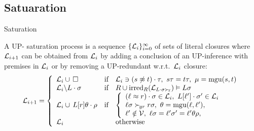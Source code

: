 \documentclass[%
]{beamer}
\begin{document}
\subsection{Satuaration}
\begin{frame}[allowframebreaks]{Saturation}
    \begin{definition}
        A UP-{ saturation process} is
        a sequence \( \{ \mathcal{L}_i \}_{i=0}^\infty \)
        of sets of literal closures where
        \( \mathcal{L}_{i+1} \) can be obtained from
        \( \mathcal{L}_i \)
        by { adding} a conclusion of an UP-inference with premises in $\mathcal{L}_i$
        or by { removing} a UP-redundant w.r.t.~\(\mathcal{L}_i\) closure:
        \begin{gather*}
            \mathcal{L}_{i+1} = \left\{
                \begin{array}{lclc}
                    \mathcal{L}_i \cup\,\square
                    &\text{if}
                    &
                        \mathcal{L}_i\ni(s\not\approx t)\cdot\tau,\ {}
                        s\tau = t\tau,\ {}
                        \mu=\operatorname{mgu}(s,t)
                    \\
                    \mathcal{L}_i \backslash L\cdot\sigma
                    &\text{if}
                    &R \cup \operatorname{irred}_R(\mathcal{L}_{L\cdot\sigma\mathrel\succ_{\!\ell}}) \vDash L\sigma
                    \\
                    \mathcal{L}_i \cup\, L[r]\theta\cdot\rho
                    &\text{if}
                    &\left\{\begin{array}{l}
                        (\ell\approx r)\cdot\sigma\in\mathcal{L}_i,\ {}
                        L[\ell']\cdot\sigma'\in\mathcal{L}_i
                        \\
                        \ell\sigma\mathrel\succ_{\!gr} r\sigma,\ {}
                        \theta=\operatorname{mgu}(\ell,\ell'),
                        \\
                        \ell'\notin\mathcal{V},\ {}
                        \ell\sigma = \ell'\sigma' = \ell'\theta\rho,
                    \end{array}\right.
                    \\
                    \mathcal{L}_i
                    &&\text{otherwise}
                \end{array}
            \right.
        \end{gather*}
    \end{definition}
    \newpage


\end{frame}
\end{document}

